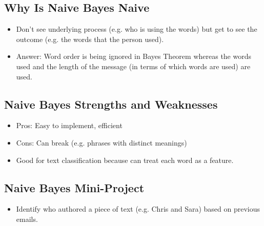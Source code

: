 \documentclass[12pt]{report}
\begin{document}
\subsection{Why Is Naive Bayes Naive}

\begin{itemize}

\item Don't see underlying process (e.g. who is using the words) but get to see the outcome (e.g. the words that the person used). 

\item Answer: Word order is being ignored in Bayes Theorem whereas the words used and the length of the message (in terms of which words are used) are used. 

\end{itemize} 

\subsection{Naive Bayes Strengths and Weaknesses}

\begin{itemize}

\item Pros: Easy to implement, efficient

\item Cons: Can break (e.g. phrases with distinct meanings)

\item Good for text classification because can treat each word as a feature. 

\end{itemize}

\subsection{Naive Bayes Mini-Project}

\begin{itemize}

\item Identify who authored a piece of text (e.g. Chris and Sara) based on previous emails. 

\end{itemize}
\end{document}
